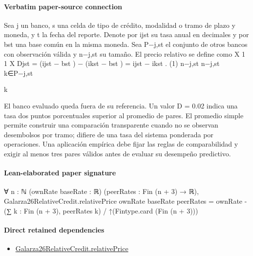 \documentclass[10pt]{article}
\begin{document}
\paragraph{Verbatim paper-source connection}
\begin{ReviewVerbatim}
Sea j un banco, s una celda de tipo de crédito, modalidad o tramo de plazo y moneda, y t la
fecha del reporte. Denote por ijst su tasa anual en decimales y por bst una base común en la misma
moneda. Sea P−j,st el conjunto de otros bancos con observación válida y n−j,st su tamaño. El precio
relativo se deﬁne como
X
1
1 X
Djst = (ijst − bst ) −
(ikst − bst ) = ijst −
ikst .
(1)
n−j,st
n−j,st
k∈P−j,st

k

El banco evaluado queda fuera de su referencia. Un valor D = 0.02 indica una tasa dos puntos
porcentuales superior al promedio de pares. El promedio simple permite construir una comparación transparente cuando no se observan desembolsos por tramo; diﬁere de una tasa del sistema
ponderada por operaciones. Una aplicación empírica debe ﬁjar las reglas de comparabilidad y exigir
al menos tres pares válidos antes de evaluar su desempeño predictivo.
\end{ReviewVerbatim}



\paragraph{Lean-elaborated paper signature}
\begin{ReviewVerbatim}
∀ {n : ℕ} (ownRate baseRate : ℝ) (peerRates : Fin (n + 3) → ℝ),
  Galarza26RelativeCredit.relativePrice ownRate baseRate peerRates =
    ownRate - (∑ k : Fin (n + 3), peerRates k) / ↑(Fintype.card (Fin (n + 3)))
\end{ReviewVerbatim}

\paragraph{Direct retained dependencies}
\begin{itemize}\raggedright
\item \hyperlink{paper-prerequisite-3b6383e0216b3c72}{Galarza26\allowbreak{}Relative\allowbreak{}Credit.\allowbreak{}relative\allowbreak{}Price}
\end{itemize}
\end{document}
